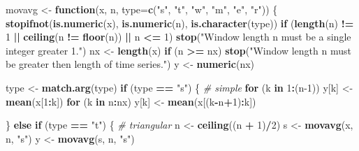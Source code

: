 \documentclass[
]{article}
\newenvironment{Shaded}{\begin{snugshade}}{\end{snugshade}}
\newcommand{\AttributeTok}[1]{\textcolor[rgb]{0.13,0.29,0.53}{#1}}
\newcommand{\CommentTok}[1]{\textcolor[rgb]{0.56,0.35,0.01}{\textit{#1}}}
\newcommand{\ControlFlowTok}[1]{\textcolor[rgb]{0.13,0.29,0.53}{\textbf{#1}}}
\newcommand{\DecValTok}[1]{\textcolor[rgb]{0.00,0.00,0.81}{#1}}
\newcommand{\FunctionTok}[1]{\textcolor[rgb]{0.13,0.29,0.53}{\textbf{#1}}}
\newcommand{\NormalTok}[1]{#1}
\newcommand{\OtherTok}[1]{\textcolor[rgb]{0.56,0.35,0.01}{#1}}
\newcommand{\SpecialCharTok}[1]{\textcolor[rgb]{0.81,0.36,0.00}{\textbf{#1}}}
\newcommand{\StringTok}[1]{\textcolor[rgb]{0.31,0.60,0.02}{#1}}
\begin{document}
\begin{Shaded}
\begin{Highlighting}[]
\NormalTok{movavg }\OtherTok{\textless{}{-}} \ControlFlowTok{function}\NormalTok{(x, n, }\AttributeTok{type=}\FunctionTok{c}\NormalTok{(}\StringTok{"s"}\NormalTok{, }\StringTok{"t"}\NormalTok{, }\StringTok{"w"}\NormalTok{, }\StringTok{"m"}\NormalTok{, }\StringTok{"e"}\NormalTok{, }\StringTok{"r"}\NormalTok{)) \{}
    \FunctionTok{stopifnot}\NormalTok{(}\FunctionTok{is.numeric}\NormalTok{(x), }\FunctionTok{is.numeric}\NormalTok{(n), }\FunctionTok{is.character}\NormalTok{(type))}
    \ControlFlowTok{if}\NormalTok{ (}\FunctionTok{length}\NormalTok{(n) }\SpecialCharTok{!=} \DecValTok{1} \SpecialCharTok{||} \FunctionTok{ceiling}\NormalTok{(n }\SpecialCharTok{!=} \FunctionTok{floor}\NormalTok{(n)) }\SpecialCharTok{||}\NormalTok{ n }\SpecialCharTok{\textless{}=} \DecValTok{1}\NormalTok{)}
        \FunctionTok{stop}\NormalTok{(}\StringTok{"Window length \textquotesingle{}n\textquotesingle{} must be a single integer greater 1."}\NormalTok{)}
\NormalTok{    nx }\OtherTok{\textless{}{-}} \FunctionTok{length}\NormalTok{(x)}
    \ControlFlowTok{if}\NormalTok{ (n }\SpecialCharTok{\textgreater{}=}\NormalTok{ nx)}
        \FunctionTok{stop}\NormalTok{(}\StringTok{"Window length \textquotesingle{}n\textquotesingle{} must be greater then length of time series."}\NormalTok{)}
\NormalTok{    y }\OtherTok{\textless{}{-}} \FunctionTok{numeric}\NormalTok{(nx)}

\NormalTok{    type }\OtherTok{\textless{}{-}} \FunctionTok{match.arg}\NormalTok{(type)}
    \ControlFlowTok{if}\NormalTok{ (type }\SpecialCharTok{==} \StringTok{"s"}\NormalTok{) \{         }\CommentTok{\# simple}
        \ControlFlowTok{for}\NormalTok{ (k }\ControlFlowTok{in} \DecValTok{1}\SpecialCharTok{:}\NormalTok{(n}\DecValTok{{-}1}\NormalTok{))  y[k] }\OtherTok{\textless{}{-}} \FunctionTok{mean}\NormalTok{(x[}\DecValTok{1}\SpecialCharTok{:}\NormalTok{k])}
        \ControlFlowTok{for}\NormalTok{ (k }\ControlFlowTok{in}\NormalTok{ n}\SpecialCharTok{:}\NormalTok{nx)     y[k] }\OtherTok{\textless{}{-}} \FunctionTok{mean}\NormalTok{(x[(k}\SpecialCharTok{{-}}\NormalTok{n}\SpecialCharTok{+}\DecValTok{1}\NormalTok{)}\SpecialCharTok{:}\NormalTok{k])}

\NormalTok{    \} }\ControlFlowTok{else} \ControlFlowTok{if}\NormalTok{ (type }\SpecialCharTok{==} \StringTok{"t"}\NormalTok{) \{  }\CommentTok{\# triangular}
\NormalTok{        n }\OtherTok{\textless{}{-}} \FunctionTok{ceiling}\NormalTok{((n }\SpecialCharTok{+} \DecValTok{1}\NormalTok{)}\SpecialCharTok{/}\DecValTok{2}\NormalTok{)}
\NormalTok{        s }\OtherTok{\textless{}{-}} \FunctionTok{movavg}\NormalTok{(x, n, }\StringTok{"s"}\NormalTok{)}
\NormalTok{        y }\OtherTok{\textless{}{-}} \FunctionTok{movavg}\NormalTok{(s, n, }\StringTok{"s"}\NormalTok{)}


\end{Highlighting}
\end{Shaded}
\end{document}

